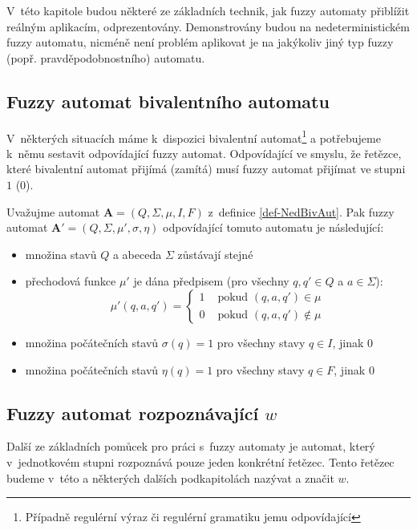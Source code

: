 V~této kapitole budou některé ze základních technik, jak fuzzy automaty přiblížit reálným aplikacím, odprezentovány. Demonstrovány budou na nedeterministickém fuzzy automatu, nicméně není problém aplikovat je na jakýkoliv jiný typ fuzzy (popř. pravděpodobnostního) automatu.

\subsection{Fuzzy automat bivalentního automatu}
V~některých situacích máme k~dispozici  bivalentní automat\footnote{Případně regulérní výraz či regulérní gramatiku jemu odpovídající} a potřebujeme k~němu sestavit odpovídající fuzzy automat. Odpovídající ve smyslu, že řetězce, které bivalentní automat přijímá (zamítá) musí fuzzy automat přijímat ve stupni $1$ ($0$).

Uvažujme automat $\mathbf{A} = (Q, \Sigma, \mu, I, F)$ z~definice \ref{def-NedBivAut}. Pak fuzzy automat $\mathbf{A}' = (Q, \Sigma, \mu', \sigma, \eta)$ odpovídající tomuto automatu je následující:
\begin{itemize}
 \item množina stavů $Q$ a abeceda $\Sigma$ zůstávají stejné
 \item přechodová funkce $\mu'$ je dána předpisem (pro všechny $q, q' \in Q$ a $a \in \Sigma$):
 $$
  \mu'(q, a, q') = 
    \begin{cases}
     1 & \text{ pokud $(q, a, q') \in \mu$} \\
     0 & \text{ pokud $(q, a, q') \notin \mu$}
    \end{cases}
 $$
 \item množina počátečních stavů $\sigma(q) = 1$ pro všechny stavy $q \in I$, jinak $0$
 \item množina počátečních stavů $\eta(q) = 1$ pro všechny stavy $q \in F$, jinak $0$
\end{itemize}

\subsection{Fuzzy automat rozpoznávající $w$} \label{sec:FuzAutRozpOme}
Další ze základních pomůcek pro práci s~fuzzy automaty je automat, který v~jednotkovém stupni rozpoznává pouze jeden konkrétní řetězec. Tento řetězec budeme v~této a některých dalších podkapitolách nazývat  a značit $w$.

